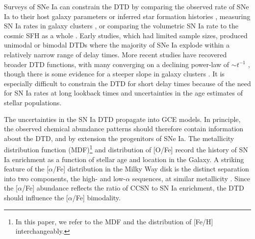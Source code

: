 \documentclass[twocolumn,twocolappendix]{aastex631}
\newcommand{\aFe}{[$\alpha$/Fe]\xspace}
\begin{document}
Surveys of SNe Ia can constrain the DTD by comparing the observed rate of SNe Ia to their host galaxy parameters \citep[e.g.,][]{Mannucci2005-SNRate,Heringer2019-FieldGalaxyDTD} or inferred star formation histories \citep[SFHs; e.g.,][]{Maoz2012-SloanIIDTD}, measuring SN Ia rates in galaxy clusters \citep[e.g.,][]{Maoz2010-ClusterDTD}, or comparing the volumetric SN Ia rate to the cosmic SFH as a whole \citep[e.g.,][]{Graur2014-VolumetricSNIaRates,Strolger2020-ExponentialDTD}. Early studies, which had limited sample sizes, produced unimodal \citep{Strolger2004-SNIaProgenitors} or bimodal \citep{Mannucci2006-TwoPopulations} DTDs where the majority of SNe Ia explode within a relatively narrow range of delay times. More recent studies have recovered broader DTD functions, with many converging on a declining power-law of $\sim t^{-1}$ \citep[e.g.,][]{Graur2013-IaRateVsMass,Graur2015-UnifiedExplanation,Maoz2017-CosmicDTD,Castrillo2021-DTD,Wiseman2021-DESRates}, though there is some evidence for a steeper slope in galaxy clusters \citep{Maoz2017-CosmicDTD,FriedmannMaoz2018-ClusterDTD}. It is especially difficult to constrain the DTD for short delay times \citep{MaozMannucci2012-SNeIaReview,Rodney2014-PromptSNeIa} because of the need for SN Ia rates at long lookback times and uncertainties in the age estimates of stellar populations.

The uncertainties in the SN Ia DTD propagate into GCE models. In principle, the observed chemical abundance patterns should therefore contain information about the DTD, and by extension the progenitors of SNe Ia. The metallicity distribution function (MDF)\footnote{In this paper, we refer to the MDF and the distribution of [Fe/H] interchangeably.} and distribution of [O/Fe] record the history of SN Ia enrichment as a function of stellar age and location in the Galaxy. A striking feature of the \aFe distribution in the Milky Way disk is the distinct separation into two components, the high- and low-$\alpha$ sequences, at similar metallicity \citep[e.g.,][]{Bensby2014-solarNeighborhoodAbundances}. Since the \aFe abundance reflects the ratio of CCSN to SN Ia enrichment, the DTD should influence the \aFe bimodality.
\end{document}

